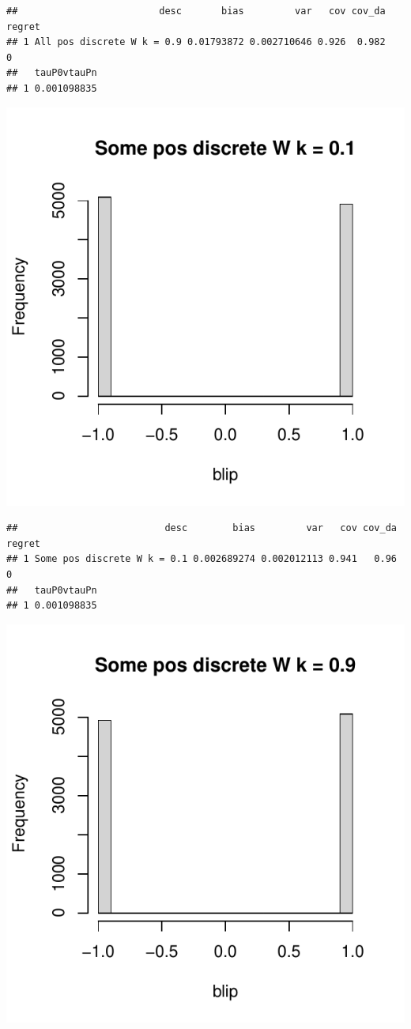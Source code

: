 \documentclass[11pt]{article}\usepackage[]{graphicx}\usepackage[table]{xcolor}
\makeatletter
\def\maxwidth{ %
  \ifdim\Gin@nat@width>\linewidth
    \linewidth
  \else
    \Gin@nat@width
  \fi
}
\newenvironment{kframe}{%
 \def\at@end@of@kframe{}%
 \ifinner\ifhmode%
  \def\at@end@of@kframe{\end{minipage}}%
  \begin{minipage}{\columnwidth}%
 \fi\fi%
 \def\FrameCommand##1{\hskip\@totalleftmargin \hskip-\fboxsep
 \colorbox{shadecolor}{##1}\hskip-\fboxsep
     \hskip-\linewidth \hskip-\@totalleftmargin \hskip\columnwidth}%
 \MakeFramed {\advance\hsize-\width
   \@totalleftmargin\z@ \linewidth\hsize
   \@setminipage}}%
 {\par\unskip\endMakeFramed%
 \at@end@of@kframe}
\newenvironment{knitrout}{}{} %
\makeatother
\begin{document}
\begin{knitrout}
\begin{kframe}\begin{verbatim}
##                         desc       bias         var   cov cov_da regret
## 1 All pos discrete W k = 0.9 0.01793872 0.002710646 0.926  0.982      0
##   tauP0vtauPn
## 1 0.001098835
\end{verbatim}
\end{kframe}
\includegraphics[width=\maxwidth]{figure/unnamed-chunk-4-3} 
\begin{kframe}\begin{verbatim}
##                          desc        bias         var   cov cov_da regret
## 1 Some pos discrete W k = 0.1 0.002689274 0.002012113 0.941   0.96      0
##   tauP0vtauPn
## 1 0.001098835
\end{verbatim}
\end{kframe}
\includegraphics[width=\maxwidth]{figure/unnamed-chunk-4-4} 

\end{knitrout}
\end{document}
